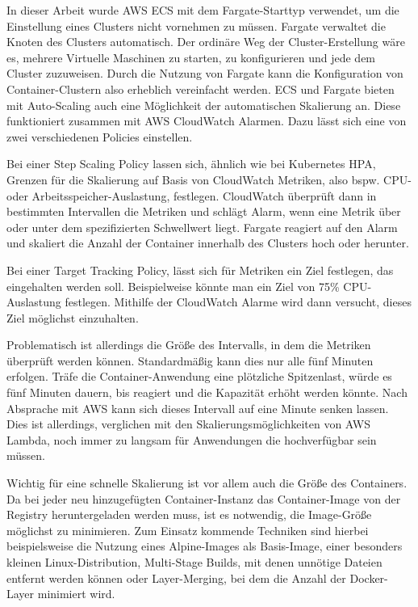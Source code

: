 In dieser Arbeit wurde AWS ECS mit dem Fargate-Starttyp verwendet, um die Einstellung eines Clusters nicht vornehmen zu müssen. Fargate verwaltet die Knoten des Clusters automatisch. Der ordinäre Weg der Cluster-Erstellung wäre es, mehrere Virtuelle Maschinen zu starten, zu konfigurieren und jede dem Cluster zuzuweisen. Durch die Nutzung von Fargate kann die Konfiguration von Container-Clustern also erheblich vereinfacht werden. ECS und Fargate bieten mit Auto-Scaling auch eine Möglichkeit der automatischen Skalierung an. Diese funktioniert zusammen mit AWS CloudWatch Alarmen. Dazu lässt sich eine von zwei verschiedenen Policies einstellen.

Bei einer Step Scaling Policy lassen sich, ähnlich wie bei Kubernetes HPA, Grenzen für die Skalierung auf Basis von CloudWatch Metriken, also bspw. CPU- oder Arbeitsspeicher-Auslastung, festlegen. CloudWatch überprüft dann in bestimmten Intervallen die Metriken und schlägt Alarm, wenn eine Metrik über oder unter dem spezifizierten Schwellwert liegt. Fargate reagiert auf den Alarm und skaliert die Anzahl der Container innerhalb des Clusters hoch oder herunter. 

Bei einer Target Tracking Policy, lässt sich für Metriken ein Ziel festlegen, das eingehalten werden soll. Beispielweise könnte man ein Ziel von 75\% CPU-Auslastung festlegen. Mithilfe der CloudWatch Alarme wird dann versucht, dieses Ziel möglichst einzuhalten. 

Problematisch ist allerdings die Größe des Intervalls, in dem die Metriken überprüft werden können. Standardmäßig kann dies nur alle fünf Minuten erfolgen. Träfe die Container-Anwendung eine plötzliche Spitzenlast, würde es fünf Minuten dauern, bis reagiert und die Kapazität erhöht werden könnte. Nach Absprache mit AWS kann sich dieses Intervall auf eine Minute senken lassen. Dies ist allerdings, verglichen mit den Skalierungsmöglichkeiten von AWS Lambda, noch immer zu langsam für Anwendungen die hochverfügbar sein müssen.

Wichtig für eine schnelle Skalierung ist vor allem auch die Größe des Containers. Da bei jeder neu hinzugefügten Container-Instanz das Container-Image von der Registry heruntergeladen werden muss, ist es notwendig, die Image-Größe möglichst zu minimieren. Zum Einsatz kommende Techniken sind hierbei beispielsweise die Nutzung eines Alpine-Images als Basis-Image, einer besonders kleinen Linux-Distribution, Multi-Stage Builds, mit denen unnötige Dateien entfernt werden können oder Layer-Merging, bei dem die Anzahl der Docker-Layer minimiert wird.


